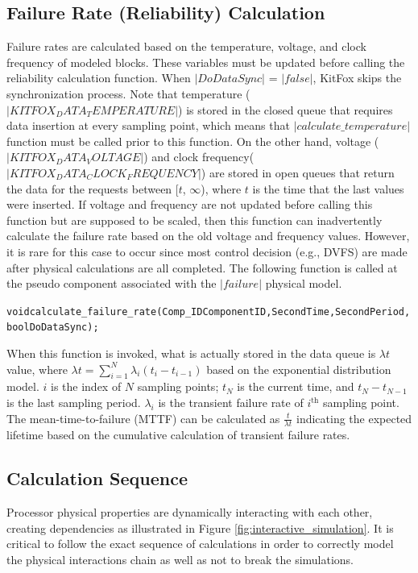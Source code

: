 \subsection{Failure Rate (Reliability) Calculation} \label{subsec:failure_rate_calculation}
\noindent
Failure rates are calculated based on the temperature, voltage, and clock frequency of modeled blocks. 
These variables must be updated before calling the reliability calculation function. 
When $|DoDataSync|$ = $|false|$, KitFox skips the synchronization process. 
Note that temperature ($|KITFOX_DATA_TEMPERATURE|$) is stored in the closed queue that requires data insertion at every sampling point, which means that $|calculate\_temperature|$ function must be called prior to this function. 
On the other hand, voltage ($|KITFOX_DATA_VOLTAGE|$) and clock frequency($|KITFOX_DATA_CLOCK_FREQUENCY|$) are stored in open queues that return the data for the requests between [$t$, $\infty$), where $t$ is the time that the last values were inserted. 
If voltage and frequency are not updated before calling this function but are supposed to be scaled, then this function can inadvertently calculate the failure rate based on the old voltage and frequency values. 
However, it is rare for this case to occur since most control decision (e.g., DVFS) are made after physical calculations are all completed.
The following function is called at the pseudo component associated with the $|failure|$ physical model. 
{
\fontsize{10pt}{11pt}\selectfont
\begin{alltt}
void calculate_failure_rate(Comp_ID ComponentID, Second Time, Second Period, bool DoDataSync);
\end{alltt}
}

\noindent
When this function is invoked, what is actually stored in the data queue is $\lambda t$ value, where $\lambda t = \sum_{i=1}^{N} \lambda_{i} (t_{i} - t_{i-1})$ based on the exponential distribution model. 
$i$ is the index of $N$ sampling points; $t_{N}$ is the current time, and $t_{N}-t_{N-1}$ is the last sampling period. 
$\lambda_{i}$ is the transient failure rate of $i^{\text{th}}$ sampling point. 
The mean-time-to-failure (MTTF) can be calculated as $\frac{t}{\lambda t}$ indicating the expected lifetime based on the cumulative calculation of transient failure rates.

\subsection{Calculation Sequence} \label{subsec:calculation_sequence}
\noindent
Processor physical properties are dynamically interacting with each other, creating dependencies as illustrated in Figure \ref{fig:interactive_simulation}. 
It is critical to follow the exact sequence of calculations in order to correctly model the physical interactions chain as well as not to break the simulations.

